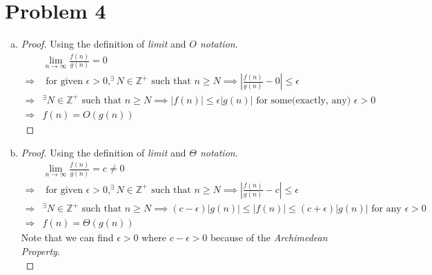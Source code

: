 \section*{Problem 4}
	\begin{enumerate} [(a)]
		\item 
		\begin{proof}
			Using the definition of \textit{limit} and \textit{$O$ notation}.
			\begin{align*}
				&\lim_{n \rightarrow \infty}\frac{f(n)}{g(n)} = 0\\
				\Rightarrow& \mbox{ for given }\epsilon > 0, ^\exists N \in \mathbb{Z}^+ \mbox{ such that } n \geq N \implies \left|\frac{f(n)}{g(n)} - 0 \right| \leq \epsilon\\
				\Rightarrow& ^\exists N \in \mathbb{Z}^+ \mbox{ such that } n \geq N \implies \left| f(n) \right| \leq \epsilon\left| g(n)\right| \mbox{ for some(exactly, any) } \epsilon > 0\\
				\Rightarrow& f(n) = O(g(n))
			\end{align*}
		\end{proof}
		\item 
		\begin{proof}
			Using the definition of \textit{limit} and \textit{$\Theta$ notation}.
			\begin{align*}
				&\lim_{n \rightarrow \infty}\frac{f(n)}{g(n)} = c \neq 0\\
				\Rightarrow& \mbox{ for given }\epsilon > 0, ^\exists N \in \mathbb{Z}^+ \mbox{ such that } n \geq N \implies \left|\frac{f(n)}{g(n)} - c \right| \leq \epsilon\\
				\Rightarrow& ^\exists N \in \mathbb{Z}^+ \mbox{ such that } n \geq N \implies (c - \epsilon)\left| g(n) \right| \leq \left| f(n) \right| \leq (c + \epsilon)\left| g(n)\right| \mbox{ for any } \epsilon > 0\\
				\Rightarrow& f(n) = \Theta(g(n))
			\end{align*}
			Note that we can find $\epsilon > 0$ where $c - \epsilon > 0$ because of the \textit{Archimedean Property}.\\
		\end{proof}
	\end{enumerate}